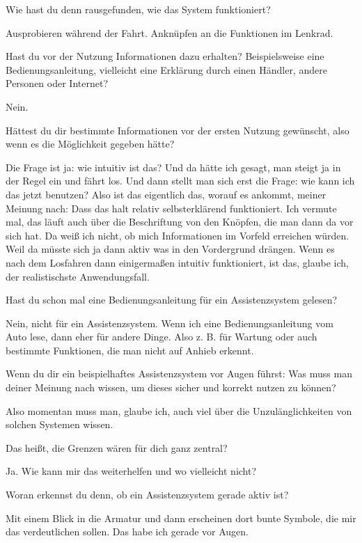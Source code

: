 \interviewerin
Wie hast du denn rausgefunden, wie das System funktioniert?

Ausprobieren während der Fahrt. Anknüpfen an die Funktionen im Lenkrad.

\interviewerin
Hast du vor der Nutzung Informationen dazu erhalten? Beispielsweise
eine Bedienungsanleitung, vielleicht eine Erklärung durch einen Händler,
andere Personen oder Internet?

Nein.

\interviewerin
Hättest du dir bestimmte Informationen vor der ersten Nutzung gewünscht,
also wenn es die Möglichkeit gegeben hätte?

Die Frage ist ja: wie intuitiv ist das? Und da hätte ich gesagt, man
steigt ja in der Regel ein und fährt los. Und dann stellt man sich erst
die Frage: wie kann ich das jetzt benutzen? Also ist das eigentlich das,
worauf es ankommt, meiner Meinung nach: Dass das halt relativ
selbsterklärend funktioniert. Ich vermute mal, das läuft auch über die
Beschriftung von den Knöpfen, die man dann da vor sich hat. Da weiß ich
nicht, ob mich Informationen im Vorfeld erreichen würden. Weil da
müsste sich ja dann aktiv was in den Vordergrund drängen. Wenn es nach
dem Losfahren dann einigermaßen intuitiv funktioniert, ist das, glaube
ich, der realistischste Anwendungsfall.

\interviewerin
Hast du schon mal eine Bedienungsanleitung für ein Assistenzsystem
gelesen?

Nein, nicht für ein Assistenzsystem. Wenn ich eine Bedienungsanleitung
vom Auto lese, dann eher für andere Dinge. Also z. B. für Wartung oder
auch bestimmte Funktionen, die man nicht auf Anhieb erkennt.

\interviewerin
Wenn du dir ein beispielhaftes Assistenzsystem vor Augen führst: Was
muss man deiner Meinung nach wissen, um dieses sicher und korrekt nutzen
zu können?

Also momentan muss man, glaube ich, auch viel über die
Unzulänglichkeiten von solchen Systemen wissen.

\interviewerin
Das heißt, die Grenzen wären für dich ganz zentral?

Ja. Wie kann mir das weiterhelfen und wo vielleicht nicht?

\interviewerin
Woran erkennst du denn, ob ein Assistenzsystem gerade aktiv ist?

Mit einem Blick in die Armatur und dann erscheinen dort bunte Symbole,
die mir das verdeutlichen sollen. Das habe ich gerade vor Augen.

